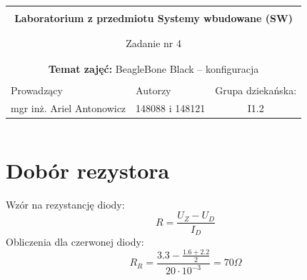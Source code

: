 \documentclass[polish,a4paper]{article}
\begin{document}
	\begin{center}
		\begin{tabular}{ p{} p{} p{} p{} p{} }
			
			&   &   &   &  \\
			\hline
			\multicolumn{5}{|c|}{}\\[-1ex]
			\multicolumn{5}{|c|}{{\LARGE \textbf{Laboratorium z przedmiotu Systemy wbudowane (SW)}}}\\
			\multicolumn{5}{|c|}{}\\[-1ex]
			\hline
			\hline
			
			\multicolumn{5}{|c|}{}\\[-1ex]
			\multicolumn{5}{|c|}{{\LARGE Zadanie nr 4}}\\
			\multicolumn{5}{|c|}{}\\[-1ex]
			\hline
			\hline
			
			\multicolumn{5}{|c|}{}\\[-1ex]
			\multicolumn{5}{|c|}{{\textbf{Temat zajęć:} BeagleBone Black – konfiguracja}}\\
			\multicolumn{5}{|c|}{}\\[-1ex]
			\hline
			\hline
			
			\multicolumn{1}{|l|}{Prowadzący} &
			\multicolumn{2}{|l|}{Autorzy} &
			\multicolumn{2}{|l|}{Grupa dziekańska:} \\
			\multicolumn{1}{|c|}{mgr inż. Ariel Antonowicz} &
			\multicolumn{2}{|c|}{148088 i 148121} &
			\multicolumn{2}{|c|}{I1.2} \\
			\hline
			\hline
		\end{tabular}
	\end{center}
	\[\]
	\section{Dobór rezystora}
	Wzór na rezystancję diody:
	$$R = \frac{U_Z - U_D}{I_D}$$
	Obliczenia dla czerwonej diody:
	$$R_R = \frac{3.3 - \frac{1.6 + 2.2}{2}}{20 \cdot 10^{-3}} = 70 \Omega$$
	
\end{document}
